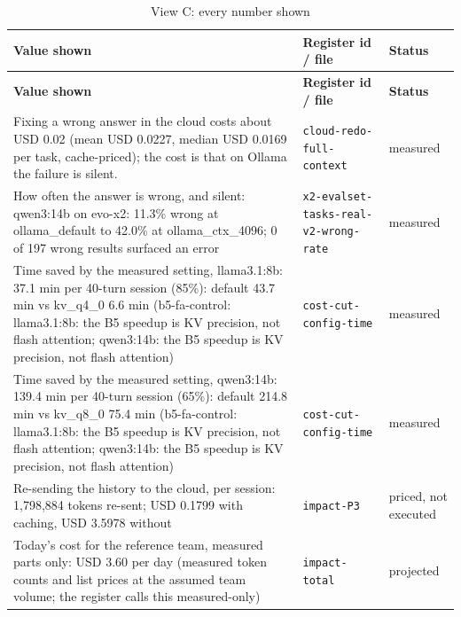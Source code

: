 \begin{longtable}{>{\raggedright\arraybackslash}p{}>{\raggedright\arraybackslash}p{}>{\raggedright\arraybackslash}p{}}
\caption{View C: every number shown}\label{tab:c}\\
\toprule
\textbf{Value shown} & \textbf{Register id / file} & \textbf{Status} \\
\midrule
\endfirsthead
\toprule
\textbf{Value shown} & \textbf{Register id / file} & \textbf{Status} \\
\midrule
\endhead
\small Fixing a wrong answer in the cloud costs about USD 0.02 (mean USD 0.0227, median USD 0.0169 per task, cache-priced); the cost is that on Ollama the failure is silent. & {\footnotesize \texttt{cloud-\allowbreak{}redo-\allowbreak{}full-\allowbreak{}context}} & \small measured \\

\small How often the answer is wrong, and silent: qwen3:14b on evo-x2: 11.3\% wrong at ollama\_default to 42.0\% at ollama\_ctx\_4096; 0 of 197 wrong results surfaced an error & {\footnotesize \texttt{x2-\allowbreak{}evalset-\allowbreak{}tasks-\allowbreak{}real-\allowbreak{}v2-\allowbreak{}wrong-\allowbreak{}rate}} & \small measured \\

\small Time saved by the measured setting, llama3.1:8b: 37.1 min per 40-turn session (85\%): default 43.7 min vs kv\_q4\_0 6.6 min (b5-fa-control: llama3.1:8b: the B5 speedup is KV precision, not flash attention; qwen3:14b: the B5 speedup is KV precision, not flash attention) & {\footnotesize \texttt{cost-\allowbreak{}cut-\allowbreak{}config-\allowbreak{}time}} & \small measured \\

\small Time saved by the measured setting, qwen3:14b: 139.4 min per 40-turn session (65\%): default 214.8 min vs kv\_q8\_0 75.4 min (b5-fa-control: llama3.1:8b: the B5 speedup is KV precision, not flash attention; qwen3:14b: the B5 speedup is KV precision, not flash attention) & {\footnotesize \texttt{cost-\allowbreak{}cut-\allowbreak{}config-\allowbreak{}time}} & \small measured \\

\small Re-sending the history to the cloud, per session: 1,798,884 tokens re-sent; USD 0.1799 with caching, USD 3.5978 without & {\footnotesize \texttt{impact-\allowbreak{}P3}} & \small priced, not executed \\

\small Today's cost for the reference team, measured parts only: USD 3.60 per day (measured token counts and list prices at the assumed team volume; the register calls this measured-only) & {\footnotesize \texttt{impact-\allowbreak{}total}} & \small projected \\


\end{longtable}
